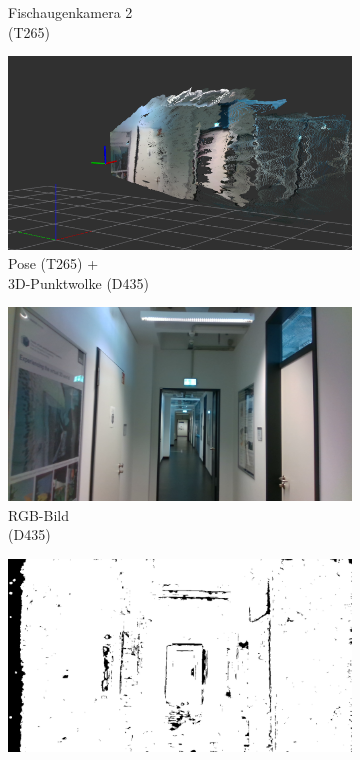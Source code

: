 \begin{figure}
\begin{subfigure}[t]{0.3\linewidth}
		\caption{Fischaugenkamera 2 \\ (T265)}
		\label{subfig:fisheye2}
	\end{subfigure}
	\hfill \medskip
	\begin{subfigure}[t]{0.3\linewidth}
		\centering
		\includegraphics[width=\linewidth]{images/real_dataset/pointcloud1.png}
		\caption{Pose (T265) + \\ 3D-Punktwolke (D435)}
		\label{subfig:odom2}
	\end{subfigure}
	\hfill
	\begin{subfigure}[t]{0.3\linewidth}
		\centering
		\includegraphics[width=\linewidth]{images/real_dataset/dc_frame000005.png}
		\caption{RGB-Bild \\ (D435) \hspace*{2cm}}
		\label{subfig:rgb-image}
	\end{subfigure}
	\hfill
	\begin{subfigure}[t]{0.3\linewidth}
		\centering
		\includegraphics[width=\linewidth]{images/real_dataset/dt_frame000005.png}

\end{subfigure}
\end{figure}
